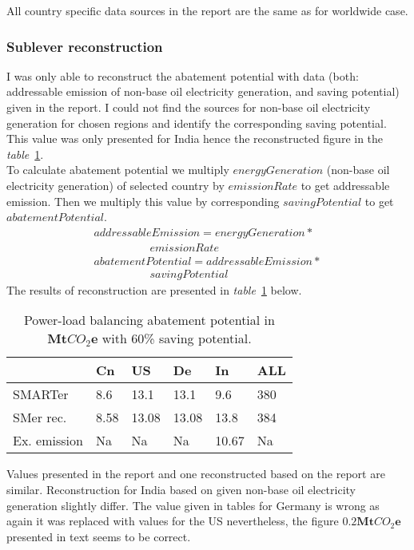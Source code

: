 \documentclass[11pt, twocolumn]{article}
\begin{document}
All country specific data sources in the report are the same as for worldwide case.

\subsubsection{Sublever reconstruction\label{sec:plb:reconstruction}}
I was only able to reconstruct the abatement potential with data (both: addressable emission of non-base oil electricity generation, and saving potential) given in the report. I could not find the sources for non-base oil electricity generation for chosen regions and identify the corresponding saving potential.\\
This value was only presented for India hence the reconstructed figure in the \emph{table}~\ref{tab:plb}.\\

To calculate abatement potential we multiply $energyGeneration$ (non-base oil electricity generation) of selected country by $emissionRate$ to get addressable emission. Then we multiply this value by corresponding $savingPotential$ to get $abatementPotential$.
\begin{gather*}
  addressableEmission = energyGeneration *\\
  \quad\quad\quad\quad\quad emissionRate\\
  abatementPotential = addressableEmission *\\
  \quad\quad\quad\quad\quad savingPotential
\end{gather*}
The results of reconstruction are presented in \emph{table}~\ref{tab:plb} below.
\begin{center}
  \begin{table}[h]
    \begin{tabular}{ p{} | p{} | p{} | p{} | p{} | p{} }
       & Cn & US & De & In & ALL \\
      \hline
      SMARTer & 8.6 & 13.1 & 13.1 & 9.6 & 380 \\
      SMer rec. & 8.58 & 13.08 & 13.08 & 13.8 & 384 \\
      Ex. emission & Na & Na & Na & 10.67 & Na
    \end{tabular}
    \caption{Power-load balancing abatement potential in $\mathbf{Mt}CO_2\mathbf{e}$ with 60\% saving potential. \label{tab:plb}}
  \end{table}
\end{center}

Values presented in the report and one reconstructed based on the report are similar. Reconstruction for India based on given non-base oil electricity generation slightly differ. The value given in tables for Germany is wrong as again it was replaced with values for the US nevertheless, the figure $\mathbf{0.2} \mathbf{Mt}CO_2\mathbf{e}$ presented in text seems to be correct.
\end{document}
